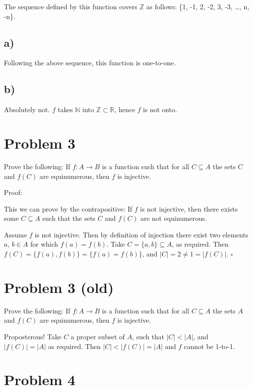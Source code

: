 \documentclass{article}
\newcommand{\R}{\mathbb{R}}
\newcommand{\Z}{\mathbb{Z}}
\newcommand{\N}{\mathbb{N}}
\begin{document}
The sequence defined by this function covers $\Z$ as follows: \{1, -1, 2, -2, 3, -3, \dots, n, -n\}. 

\subsection*{a)}

Following the above sequence, this function is one-to-one. 

\subsection*{b)}

Absolutely not. $f$ takes $\N$ into $\Z \subset \R$, hence $f$ is not onto. 

\section*{Problem 3}


Prove the following: If $f: A \rightarrow B$ is a function such that for all $C \subseteq A$ the sets $C$ and $f(C)$ are equinumerous, then $f$ is injective. 

Proof: 

This we can prove by the contrapositive: If $f$ is not injective, then there exists some $C \subseteq A$ such that the sets $C$ and $f(C)$ are not equinumerous. 

Assume $f$ is not injective. 
Then by definition of injection there exist two elements $a, \, b \in A$ for which $f(a) = f(b)$. 
Take $C = \{a, b\} \subseteq A$, as required. 
Then $f(C) = \{f(a), f(b)\} = \{f(a) =f(b)\}$, and $|C| = 2 \neq 1 = |f(C)|$. $\square$ 

\section*{Problem 3 (old)}

Prove the following: If $f: A \rightarrow B$ is a function such that for all $C \subseteq A$ the sets $A$ and $f(C)$ are equinumerous, then $f$ is injective. 

Proposterous! Take $C$ a proper subset of $A$, such that $|C| < |A|$, and $|f(C)| = |A|$ as required. Then $|C| < |f(C)| = |A|$ and $f$ cannot be 1-to-1.

\section*{Problem 4}
\end{document}

